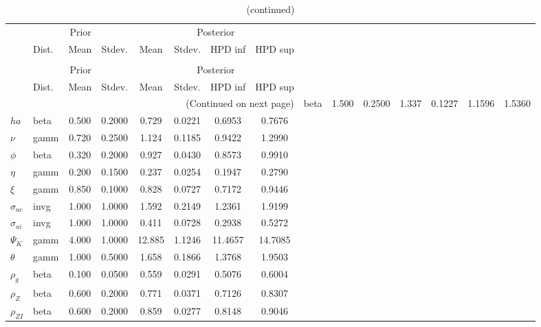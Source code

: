  
\begin{center}
\begin{longtable}{llcccccc} 
\caption{Results from Metropolis-Hastings (parameters)}
 \label{Table:MHPosterior:1}\\
\toprule 
  & \multicolumn{3}{c}{Prior}  &  \multicolumn{4}{c}{Posterior} \\
  \cmidrule(r{.75em}){2-4} \cmidrule(r{.75em}){5-8}
  & Dist. & Mean  & Stdev. & Mean & Stdev. & HPD inf & HPD sup\\
\midrule \endfirsthead 
\caption{(continued)}\\\toprule 
  & \multicolumn{3}{c}{Prior}  &  \multicolumn{4}{c}{Posterior} \\
  \cmidrule(r{.75em}){2-4} \cmidrule(r{.75em}){5-8}
  & Dist. & Mean  & Stdev. & Mean & Stdev. & HPD inf & HPD sup\\
\midrule \endhead 
\bottomrule \multicolumn{8}{r}{(Continued on next page)} \endfoot 
\bottomrule \endlastfoot 
${\sigma}$ & beta &   1.500 & 0.2500 &   1.337& 0.1227 &  1.1596 &  1.5360 \\ 
${ha}$ & beta &   0.500 & 0.2000 &   0.729& 0.0221 &  0.6953 &  0.7676 \\ 
$\nu$ & gamm &   0.720 & 0.2500 &   1.124& 0.1185 &  0.9422 &  1.2990 \\ 
${\phi}$ & beta &   0.320 & 0.2000 &   0.927& 0.0430 &  0.8573 &  0.9910 \\ 
${\eta}$ & gamm &   0.200 & 0.1500 &   0.237& 0.0254 &  0.1947 &  0.2790 \\ 
$\xi$ & gamm &   0.850 & 0.1000 &   0.828& 0.0727 &  0.7172 &  0.9446 \\ 
${\sigma_{ac}}$ & invg &   1.000 & 1.0000 &   1.592& 0.2149 &  1.2361 &  1.9199 \\ 
${\sigma_{ai}}$ & invg &   1.000 & 1.0000 &   0.411& 0.0728 &  0.2938 &  0.5272 \\ 
${\Psi_{K}}$ & gamm &   4.000 & 1.0000 &  12.885& 1.1246 & 11.4657 & 14.7085 \\ 
${\theta}$ & gamm &   1.000 & 0.5000 &   1.658& 0.1866 &  1.3768 &  1.9503 \\ 
${\rho_g}$ & beta &   0.100 & 0.0500 &   0.559& 0.0291 &  0.5076 &  0.6004 \\ 
${\rho_Z}$ & beta &   0.600 & 0.2000 &   0.771& 0.0371 &  0.7126 &  0.8307 \\ 
${\rho_{ZI}}$ & beta &   0.600 & 0.2000 &   0.859& 0.0277 &  0.8148 &  0.9046 \\ 

\end{longtable}
\end{center}
